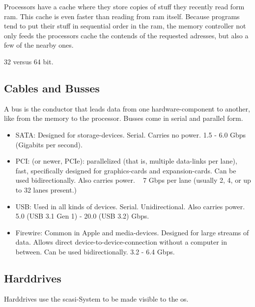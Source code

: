Processors have a cache where they store copies of stuff they recently read form ram. This cache is even faster than reading from ram itself. Because programs tend to put their stuff in sequential order in the ram, the memory controller not only feeds the processors cache the contends of the requested adresses, but also a few of the nearby ones. 

32 versus 64 bit.


\subsection{Cables and Busses}

A bus is the conductor that leads data from one hardware-component to another, like from the memory to the processor. Busses come in serial and parallel form. 

\begin{itemize}
    \item SATA: Designed for storage-devices. Serial. Carries no power. 1.5 - 6.0 Gbps (Gigabits per second).
    \item PCI: (or newer, PCIe): parallelized (that is, multiple data-links per lane), fast, specifically designed for graphics-cards and expansion-cards. Can be used bidirectionally. Also carries power. ~ 7 Gbps per lane (usually 2, 4, or up to 32 lanes present.)
    \item USB: Used in all kinds of devices. Serial. Unidirectional. Also carries power. 5.0 (USB 3.1 Gen 1) - 20.0 (USB 3.2) Gbps.
    \item Firewire: Common in Apple and media-devices. Designed for large streams of data. Allows direct device-to-device-connection without a computer in between. Can be used bidirectionally. 3.2 - 6.4 Gbps.
\end{itemize}



\subsection{Harddrives}
Harddrives use the scasi-System to be made visible to the os. 

